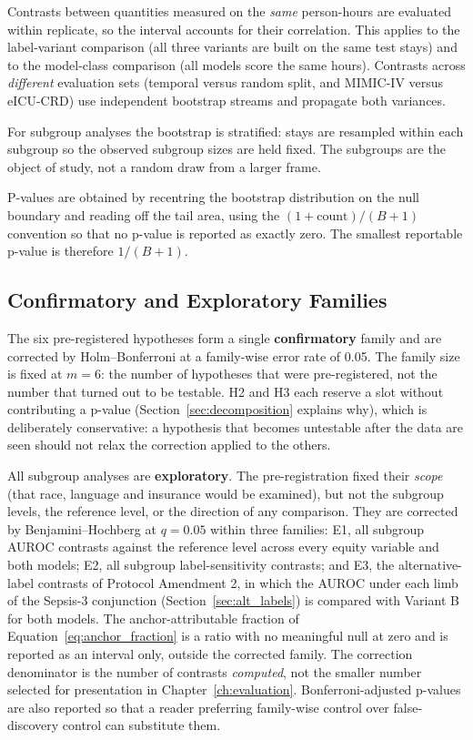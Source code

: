 Contrasts between quantities measured on the \emph{same} person-hours are
evaluated within replicate, so the interval accounts for their correlation.
This applies to the label-variant comparison (all three variants are built on
the same test stays) and to the model-class comparison (all models score the
same hours). Contrasts across \emph{different} evaluation sets (temporal
versus random split, and MIMIC-IV versus eICU-CRD) use independent bootstrap
streams and propagate both variances.

For subgroup analyses the bootstrap is stratified: stays are resampled within
each subgroup so the observed subgroup sizes are held fixed. The subgroups are
the object of study, not a random draw from a larger frame.

P-values are obtained by recentring the bootstrap distribution on the null
boundary and reading off the tail area, using the $(1 + \text{count})/(B + 1)$
convention so that no p-value is reported as exactly zero. The smallest
reportable p-value is therefore $1/(B+1)$.

\subsection{Confirmatory and Exploratory Families}

The six pre-registered hypotheses form a single \textbf{confirmatory} family
and are corrected by Holm--Bonferroni at a family-wise error rate of 0.05. The
family size is fixed at $m = 6$: the number of hypotheses that were
pre-registered, not the number that turned out to be testable. H2 and H3 each
reserve a slot without contributing a p-value (Section~\ref{sec:decomposition}
explains why), which is deliberately conservative: a hypothesis that becomes
untestable after the data are seen should not relax the correction applied to
the others.

All subgroup analyses are \textbf{exploratory}. The pre-registration fixed
their \emph{scope} (that race, language and insurance would be examined),
but not the subgroup levels, the reference level, or the direction of any
comparison. They are corrected by Benjamini--Hochberg at $q = 0.05$ within
three families: E1, all subgroup AUROC contrasts against the reference level
across every equity variable and both models; E2, all subgroup
label-sensitivity contrasts; and E3, the alternative-label contrasts of
Protocol Amendment 2, in which the AUROC under each limb of the Sepsis-3
conjunction (Section~\ref{sec:alt_labels}) is compared with Variant B for both
models. The anchor-attributable fraction of
Equation~\ref{eq:anchor_fraction} is a ratio with no meaningful null at zero
and is reported as an interval only, outside the corrected family. The
correction denominator is the number of
contrasts \emph{computed}, not the smaller number selected for presentation in
Chapter~\ref{ch:evaluation}. Bonferroni-adjusted p-values are also reported so
that a reader preferring family-wise control over false-discovery control can
substitute them.

